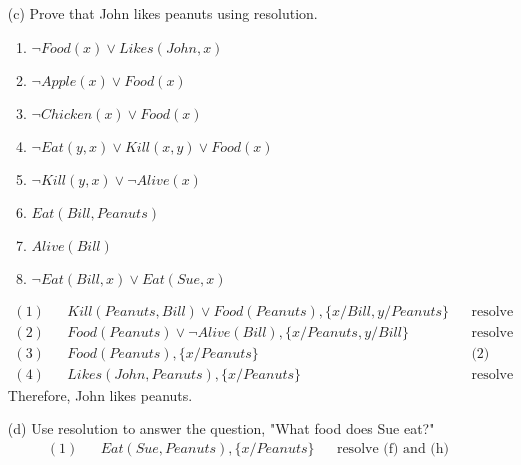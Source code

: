 \documentclass[13pt]{article}
\begin{document}
\begin{enumerate}
\item [(c)] Prove that John likes peanuts using resolution.
  \begin{enumerate}[label=(\alph*)]
  \item $\neg Food(x) \lor Likes(John, x)$
  \item $\neg Apple(x) \lor Food(x)$
  \item $\neg Chicken(x) \lor Food(x)$
  \item $\neg Eat(y, x) \lor Kill(x, y) \lor Food(x)$
  \item $\neg Kill(y, x) \lor \neg Alive(x)$
  \item $Eat(Bill, Peanuts)$
  \item $Alive(Bill)$
  \item $\neg Eat(Bill, x) \lor Eat(Sue, x)$
  \end{enumerate}
  \begin{align*}
    (1) && Kill(Peanuts, Bill) \lor Food(Peanuts), \{x/Bill, y/Peanuts\} && \text{resolve (d) and (f)} \\
    (2) && Food(Peanuts) \lor \neg Alive(Bill), \{x/Peanuts, y/Bill\} && \text{resolve (1) and (e)} \\
    (3) && Food(Peanuts), \{x/Peanuts\} && \text{(2) and (g)} \\
    (4) && Likes(John, Peanuts), \{x/Peanuts\} && \text{resolve (a) and (3)}
  \end{align*}
  Therefore, John likes peanuts.
  
\item [(d)] Use resolution to answer the question, "What food does Sue eat?"
  \begin{align*}
    (1) && Eat(Sue, Peanuts), \{x/Peanuts\} && \text{resolve (f) and (h)}
  \end{align*}


\end{enumerate}
\end{document}
